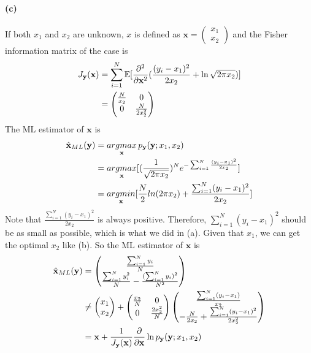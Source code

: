 \documentclass{article}
\begin{document}
\paragraph{(c)}
If both $x_1$ and $x_2$ are unknown, $x$ is defined as $\mathbf{x}=\begin{pmatrix}
	x_1\\x_2
\end{pmatrix}$ and the Fisher information matrix of the case is
\begin{align}
	J_{\mathbf{y}}(\mathbf{x})&=\sum_{i=1}^N\mathbb{E}[\frac{\partial^2}{\partial \mathbf{x}^2}(\frac{(y_i-x_1)^2}{2x_2}+\ln \sqrt{2\pi x_2})]\notag\\
	&=\begin{pmatrix}
		\frac{N}{x_2}&0\\
		0&\frac{N}{2x_2^2}
	\end{pmatrix}\notag
\end{align}
The ML estimator of $\mathbf{x}$ is
\begin{align}
	\hat{\mathbf{x}}_{ML}(\mathbf{y})&=\mathop{argmax}_{\mathbf{x}}p_{\mathbf{y}}(\mathbf{y};x_1,x_2)\notag\\
	&=\mathop{argmax}_{\mathbf{x}}[(\frac{1}{\sqrt{2\pi x_2}})^Ne^{-\sum_{i=1}^N\frac{(y_i-x_1)^2}{2x_2}}]\notag\\
	&=\mathop{argmin}_{\mathbf{x}}[\frac{N}{2}ln (2\pi x_2)+\frac{\sum_{i=1}^N(y_i-x_1)^2}{2x_2}]\notag
\end{align}
Note that $\frac{\sum_{i=1}^N(y_i-x_1)^2}{2x_2}$ is always positive. Therefore, $\sum_{i=1}^N(y_i-x_1)^2$ should be as small as possible, which is what we did in (a). Given that $x_1$, we can get the optimal $x_2$ like (b). So the ML estimator of $\mathbf{x}$ is
\begin{align}
	\hat{\mathbf{x}}_{ML}(\mathbf{y})&=\begin{pmatrix}
		\frac{\sum_{i=1}^N y_i}{N}\\
		\frac{\sum_{i=1}^Ny_i^2}{N}-\frac{(\sum_{i=1}^N y_i)^2}{N^2}
	\end{pmatrix}\notag\\
	&\neq \begin{pmatrix}
		x_1\\x_2
	\end{pmatrix}+\begin{pmatrix}
		\frac{x_2}{N}&0\\0&\frac{2x_2^2}{N}
	\end{pmatrix}\begin{pmatrix}
		\frac{\sum_{i=1}^N(y_i-x_1)}{x_2}\\
		-\frac{N}{2x_2}+\frac{\sum_{i=1}^N(y_i-x_1)^2}{2x_2^2}
	\end{pmatrix}\notag\\
	&=\mathbf{x}+\frac{1}{J_{\mathbf{y}}(\mathbf{x})}\frac{\partial}{\partial \mathbf{x}}\ln p_{\mathbf{y}}(\mathbf{y};x_1,x_2)\notag
\end{align}
\end{document}

